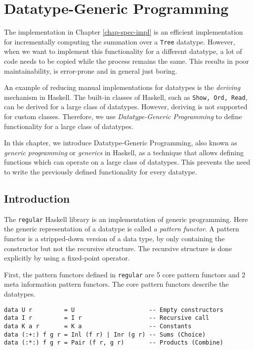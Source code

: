 \chapter{Datatype-Generic Programming}

The implementation in Chapter \ref{chap-spec-impl} is an efficient implementation for incrementally computing the summation over a \texttt{Tree} datatype. However, when we want to implement this functionality for a different datatype, a lot of code needs to be copied while the process remains the same. This results in poor maintainability, is error-prone and in general just boring.

An example of reducing manual implementations for datatypes is the \textit{deriving} mechanism in Haskell. The built-in classes of Haskell, such as \texttt{Show, Ord, Read}, can be derived for a large class of datatypes. However, deriving is not supported for custom classes. Therefore, we use \textit{Datatype-Generic Programming}\cite*{gibbons2006datatype} to define functionality for a large class of datatypes.

In this chapter, we introduce Datatype-Generic Programming, also known as \textit{generic programming} or \textit{generics} in Haskell, as a technique that allows defining functions which can operate on a large class of datatypes. This prevents the need to write the previously defined functionality for every datatype.

\section{Introduction}
The \texttt{regular} Haskell library is an implementation of generic programming. Here the generic representation of a datatype is called a \textit{pattern functor}. A pattern functor is a stripped-down version of a data type, by only containing the constructor but not the recursive structure. The recursive structure is done explicitly by using a fixed-point operator. 

First, the pattern functors defined in \texttt{regular} are 5 core pattern functors and 2 meta information pattern functors. The core pattern functors describe the datatypes.

\begin{verbatim}
data U r         = U                     -- Empty constructors
data I r         = I r                   -- Recursive call
data K a r       = K a                   -- Constants
data (:+:) f g r = Inl (f r) | Inr (g r) -- Sums (Choice)
data (:*:) f g r = Pair (f r, g r)       -- Products (Combine)
\end{verbatim}

